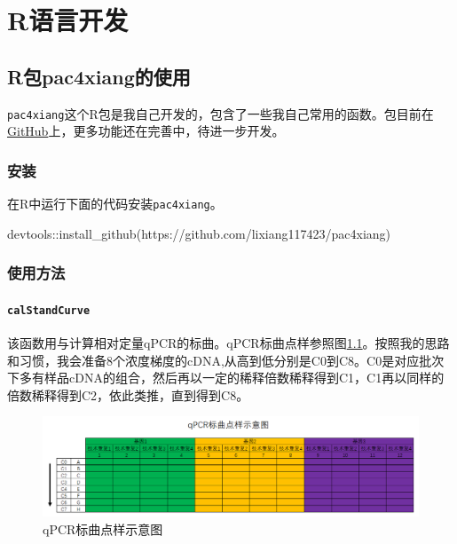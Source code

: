 \documentclass[
  10pt,
]{book}
\newenvironment{Shaded}{\begin{snugshade}}{\end{snugshade}}
\newcommand{\FunctionTok}[1]{\textcolor[rgb]{0.00,0.00,0.00}{#1}}
\newcommand{\NormalTok}[1]{#1}
\newcommand{\SpecialCharTok}[1]{\textcolor[rgb]{0.00,0.00,0.00}{#1}}
\newcommand{\StringTok}[1]{\textcolor[rgb]{0.31,0.60,0.02}{#1}}
\begin{document}
\hypertarget{r-deve}{%
\chapter{R语言开发}\label{r-deve}}

\hypertarget{pac4xiang}{%
\section{R包pac4xiang的使用}\label{pac4xiang}}

\texttt{pac4xiang}这个R包是我自己开发的，包含了一些我自己常用的函数。包目前在\href{https://github.com/lixiang117423/pac4xiang}{GitHub}上，更多功能还在完善中，待进一步开发。

\hypertarget{ux5b89ux88c5}{%
\subsection{安装}\label{ux5b89ux88c5}}

在R中运行下面的代码安装\texttt{pac4xiang}。

\begin{Shaded}
\begin{Highlighting}[]
\NormalTok{devtools}\SpecialCharTok{::}\FunctionTok{install\_github}\NormalTok{(}\StringTok{\textquotesingle{}https://github.com/lixiang117423/pac4xiang\textquotesingle{}}\NormalTok{)}
\end{Highlighting}
\end{Shaded}

\hypertarget{ux4f7fux7528ux65b9ux6cd5}{%
\subsection{使用方法}\label{ux4f7fux7528ux65b9ux6cd5}}

\hypertarget{calstandcurve}{%
\subsubsection{\texorpdfstring{\texttt{calStandCurve}}{calStandCurve}}\label{calstandcurve}}

该函数用与计算相对定量qPCR的标曲。qPCR标曲点样参照图\ref{fig:qPCR1}。按照我的思路和习惯，我会准备8个浓度梯度的cDNA,从高到低分别是C0到C8。C0是对应批次下多有样品cDNA的组合，然后再以一定的稀释倍数稀释得到C1，C1再以同样的倍数稀释得到C2，依此类推，直到得到C8。

\begin{figure}

{\centering \includegraphics[width=16.25in]{figures/pac4xiang使用说明/1} 

}

\caption{qPCR标曲点样示意图}\label{fig:qPCR1}
\end{figure}
\end{document}
